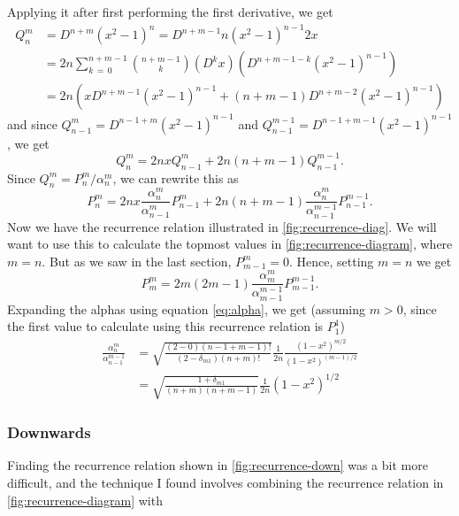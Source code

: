 \documentclass[12pt]{article}
\begin{document}
Applying it after first performing the first derivative, we get
\begin{align}
  Q_n^m &= D^{n+m}(x^2 - 1)^n = D^{n + m - 1}n(x^2 - 1)^{n-1}2x\\ 
  &= 2n\sum_{k\,=\,0}^{n+m-1}{n+m-1\choose k}\left(D^k x\right)\left(D^{n+m-1-k}(x^2 - 1)^{n-1}\right)\\ 
  &= 2n\left(xD^{n+m-1}(x^2 - 1)^{n-1} + (n+m-1)D^{n+m-2}(x^2-1)^{n-1}\right)
\end{align}
and since $Q_{n-1}^{m} = D^{n-1+m}(x^2-1)^{n-1}$ and $Q_{n-1}^{m-1}=D^{n-1+m-1}(x^2-1)^{n-1}$, we get
\begin{equation}\label{eq:recurrence-diag-Q}
  Q_n^m = 2nxQ_{n-1}^m + 2n(n+m-1)Q_{n-1}^{m-1}.
\end{equation}
Since $Q_n^m=P_n^m/\alpha_n^m$, we can rewrite this as 
\begin{equation}
  P_n^m = 2nx\frac{\alpha_n^m}{\alpha_{n-1}^m}P_{n-1}^m + 2n(n+m-1)\frac{\alpha_n^m}{\alpha_{n-1}^{m-1}}P_{n-1}^{m-1}.
\end{equation}
Now we have the recurrence relation illustrated in \autoref{fig:recurrence-diag}. We will want to use this to calculate the topmost values in \autoref{fig:recurrence-diagram}, where $m=n$. But as we saw in the last section, $P_{m-1}^m = 0$. Hence, setting $m = n$ we get 
\begin{equation}
  P_m^m = 2m(2m-1)\frac{\alpha_m^m}{\alpha_{m-1}^{m-1}}P_{m-1}^{m-1}.
\end{equation}
Expanding the alphas using equation \eqref{eq:alpha}, we get (assuming $m>0$, since the first value to calculate using this recurrence relation is $P_1^1$)
\begin{align}
  \frac{\alpha_n^m}{\alpha_{n-1}^{m-1}} &= \sqrt{\frac{(2-0)(n-1+m-1)!}{(2-\delta_{m1})(n+m)!}}\frac{1}{2n}\frac{(1-x^2)^{m/2}}{(1-x^2)^{(m-1)/2}}\\ 
                                        &= \sqrt{\frac{1+\delta_{m1}}{(n+m)(n+m-1)}}\frac{1}{2n}(1-x^2)^{1/2}
\end{align}

\subsubsection{Downwards}
Finding the recurrence relation shown in \autoref{fig:recurrence-down} was a bit more difficult, and the technique I found involves combining the recurrence relation in \autoref{fig:recurrence-diagram} with 

%


\printbibliography
\end{document}
